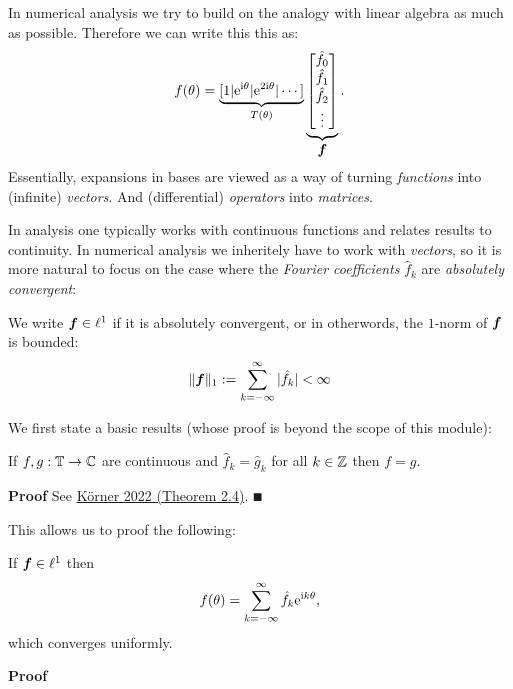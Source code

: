 In numerical analysis we try to build on the analogy with linear algebra as much as possible. Therefore we  can write this this as:
\[
f(\theta) = \underbrace{[1 | {\rm e}^{{\rm i}\theta} | {\rm e}^{2{\rm i}\theta} | \cdots]}_{T(\theta)}
\underbrace{\begin{bmatrix} \hat f_0 \\ \hat f_1 \\ \hat f_2 \\ \vdots \end{bmatrix}}_{{\mbox{\boldmath$f$\unboldmath}}}.
\]
Essentially, expansions in bases are viewed as a way of turning \emph{functions} into (infinite) \emph{vectors}. And (differential) \emph{operators} into \emph{matrices}.

In analysis one typically works with continuous functions and relates results to continuity. In numerical analysis we inheritely have to work with \emph{vectors}, so it is more natural to  focus on the case where the \emph{Fourier coefficients} $\hat f_k$ are \emph{absolutely convergent}:

\begin{definition} We write ${\mbox{\boldmath$f$\unboldmath}} \in \ell^1$ if it is absolutely convergent, or in otherwords, the $1$-norm of ${\mbox{\boldmath$f$\unboldmath}}$ is bounded:
\[
\|{\mbox{\boldmath$f$\unboldmath}}\|_1 := \sum_{k=-\infty}^\infty |\hat f_k| < \infty
\]
\end{definition}

We first state a  basic results (whose proof is beyond the scope of this module):

\begin{theorem} If $f, g : {\mathbb T} \rightarrow {\mathbb C}$ are continuous and $\hat f_k = \hat g_k$ for all $k \in {\mathbb Z}$ then $f = g$.

\end{theorem}
\textbf{Proof} See \href{https://www.cambridge.org/core/books/fourier-analysis/5FD8F0FD69DDB139019655D7F8440D2F}{Körner 2022 (Theorem 2.4)}. \ensuremath{\QED}

This allows us to proof the following:

\begin{theorem} If ${\mbox{\boldmath$f$\unboldmath}} \in \ell^1$ then
\[
f(\ensuremath{\theta}) = \ensuremath{\sum}_{k = -\ensuremath{\infty}}^\ensuremath{\infty} \hat f_k {\rm e}^{{\rm i} k \ensuremath{\theta}},
\]
which converges uniformly. \end{theorem}
\textbf{Proof}

